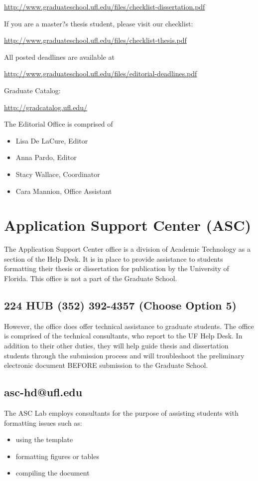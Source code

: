 \url{http://www.graduateschool.ufl.edu/files/checklist-dissertation.pdf}

\noindent If you are a master?s thesis student, please visit our checklist:

\url{http://www.graduateschool.ufl.edu/files/checklist-thesis.pdf}

\noindent All posted deadlines are available at

\url{http://www.graduateschool.ufl.edu/files/editorial-deadlines.pdf}

\noindent Graduate Catalog:

\url{http://gradcatalog.ufl.edu/}

The Editorial Office is comprised of
    \begin{itemize}
    \item Lisa De LaCure, Editor \vspace{-10 pt}
    \item Anna Pardo, Editor \vspace{-10 pt}
    \item Stacy Wallace, Coordinator \vspace{-10 pt}
    \item Cara Mannion, Office Assistant
    \end{itemize}



\section{Application Support Center (ASC)}
The Application Support Center office is a division of Academic Technology as a section of the Help Desk. It is in place to provide assistance to students formatting their thesis or dissertation for publication by the University of Florida. This office is not a part of the Graduate School.
\subsection{224 HUB (352) 392-4357 (Choose Option 5)}
However, the office does offer technical assistance to graduate students. The office is comprised of the technical consultants, who report to the UF Help Desk. In addition to their other duties, they will help guide thesis and dissertation students through the submission process and will troubleshoot the preliminary electronic document BEFORE submission to the Graduate School.
\subsection{asc-hd@ufl.edu}
The ASC Lab employs consultants for the purpose of assisting students with formatting issues such as:
    \begin{itemize}
    \item using the template \vspace{-10 pt}
    \item formatting figures or tables \vspace{-10 pt}
    \item compiling the document
    \end{itemize}
    
